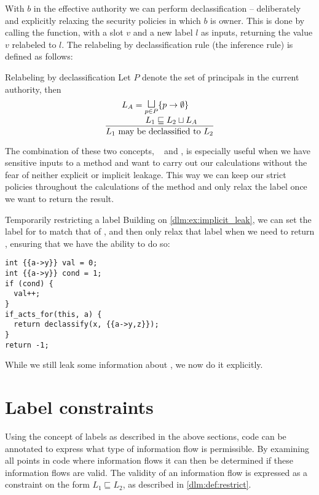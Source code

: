 With $b$ in the effective authority we can perform declassification -- deliberately and explicitly relaxing the security policies in which $b$ is owner.
This is done by calling the \dlmdeclassify{} function, with a slot $v$ and a new label $l$ as inputs, returning the value $v$ relabeled to $l$.
The relabeling by declassification rule (the inference rule) is defined as follows:

\begin{definition}{Relabeling by declassification}
  Let $P$ denote the set of principals in the current authority, then
  \[
  \frac
  {
    \splitfrac
    {
      L_A = \mathlarger\sqcupl_{p \in P} \{p \rightarrow \emptyset \}
    }
    {
      L_1 \sqsubseteq L_2 \sqcup L_A
    }
  }
  {
    L_1 \text{ may be declassified to } L_2
  }
  \]
\end{definition}

The combination of these two concepts, \dlmactsfor~ and \dlmdeclassify, is especially useful when we have sensitive inputs to a method and want to carry out our calculations without the fear of neither explicit or implicit leakage.
This way we can keep our strict policies throughout the calculations of the method and only relax the label once we want to return the result.

\begin{example}{Temporarily restricting a label}
  Building on \cref{dlm:ex:implicit_leak}, we can set the label for  to match that of , and then only relax that label when we need to return , ensuring that we have the ability to do so:
  \begin{lstlisting}[style=dlmc]
int {{a->y}} val = 0;
int {{a->y}} cond = 1;
if (cond) {
  val++;
}
if_acts_for(this, a) {
  return declassify(x, {{a->y,z}});
}
return -1;
  \end{lstlisting}
  While we still leak some information about , we now do it explicitly.
\end{example}

\section{Label constraints}\label{dlm:constraints}
Using the concept of labels as described in the above sections, code can be annotated to express what type of information flow is permissible.
By examining all points in code where information flows it can then be determined if these information flows are valid.
The validity of an information flow is expressed as a constraint on the form $L_1 \sqsubseteq L_2$, as described in \cref{dlm:def:restrict}.

